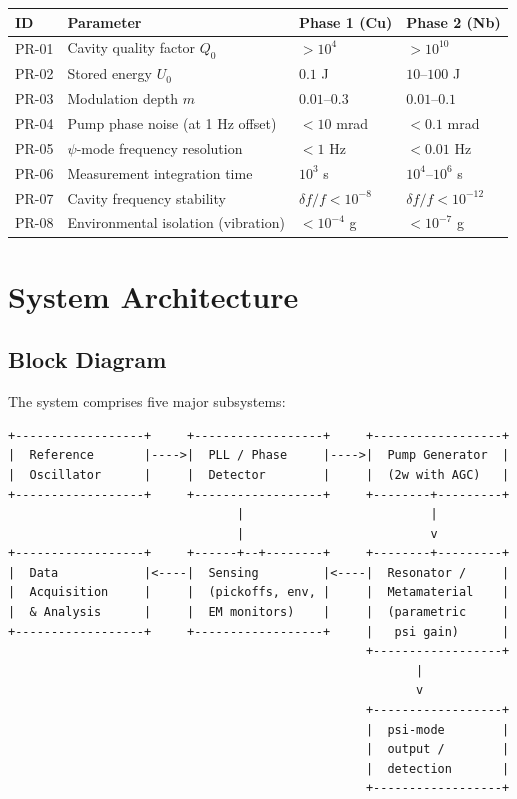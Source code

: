\documentclass[12pt,letterpaper]{article}
\begin{document}
\begin{longtable}{p{1.2cm}p{8cm}p{2.5cm}p{2.5cm}}
\toprule
\textbf{ID} & \textbf{Parameter} & \textbf{Phase 1 (Cu)} & \textbf{Phase 2 (Nb)} \\
\midrule
\endfirsthead
PR-01 & Cavity quality factor $Q_0$ & $> 10^4$ & $> 10^{10}$ \\
PR-02 & Stored energy $U_0$ & $0.1$ J & $10$--$100$ J \\
PR-03 & Modulation depth $m$ & $0.01$--$0.3$ & $0.01$--$0.1$ \\
PR-04 & Pump phase noise (at 1 Hz offset) & $< 10$ mrad & $< 0.1$ mrad \\
PR-05 & $\psi$-mode frequency resolution & $< 1$ Hz & $< 0.01$ Hz \\
PR-06 & Measurement integration time & $10^3$ s & $10^4$--$10^6$ s \\
PR-07 & Cavity frequency stability & $\delta f/f < 10^{-8}$ & $\delta f/f < 10^{-12}$ \\
PR-08 & Environmental isolation (vibration) & $< 10^{-4}$ g & $< 10^{-7}$ g \\
\bottomrule
\end{longtable}

\section{System Architecture}

\subsection{Block Diagram}

The system comprises five major subsystems:

\begin{verbatim}
+------------------+     +------------------+     +------------------+
|  Reference       |---->|  PLL / Phase     |---->|  Pump Generator  |
|  Oscillator      |     |  Detector        |     |  (2w with AGC)   |
+------------------+     +------------------+     +--------+---------+
                                |                          |
                                |                          v
+------------------+     +------+--+--------+     +--------+---------+
|  Data            |<----|  Sensing         |<----|  Resonator /     |
|  Acquisition     |     |  (pickoffs, env, |     |  Metamaterial    |
|  & Analysis      |     |  EM monitors)    |     |  (parametric     |
+------------------+     +------------------+     |   psi gain)      |
                                                  +------------------+
                                                         |
                                                         v
                                                  +------------------+
                                                  |  psi-mode        |
                                                  |  output /        |
                                                  |  detection       |
                                                  +------------------+
\end{verbatim}
\end{document}
